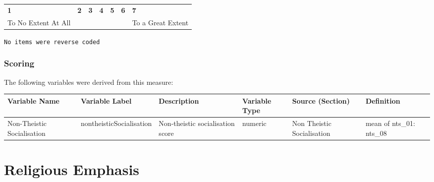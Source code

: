 \documentclass[
  letterpaper,
]{scrbook}
\begin{document}
\begin{longtable}[]{@{}
  >{\raggedright\arraybackslash}p{}
  >{\raggedright\arraybackslash}p{}
  >{\raggedright\arraybackslash}p{}
  >{\raggedright\arraybackslash}p{}
  >{\raggedright\arraybackslash}p{}
  >{\raggedright\arraybackslash}p{}
  >{\raggedright\arraybackslash}p{}@{}}
\toprule\noalign{}
\endhead
\bottomrule\noalign{}
\endlastfoot
\textbf{1} & \textbf{2} & \textbf{3} & \textbf{4} & \textbf{5} &
\textbf{6} & \textbf{7} \\
To No Extent At All & & & & & & To a Great Extent \\
\end{longtable}

\texttt{No\ items\ were\ reverse\ coded}

\subsection{Scoring}\label{scoring-5}

The following variables were derived from this measure:

\begin{tabu} to 
\toprule
Variable Name & Variable Label & Description & Variable Type & Source (Section) & Definition\\
\midrule
Non-Theistic Socialisation & nontheisticSocialisation & Non-theistic socialisation score & numeric & Non Theistic Socialisation & mean of nts\_01: nts\_08\\
\bottomrule
\end{tabu}

\section{}\label{section-1}

\chapter{Religious Emphasis}\label{religious-emphasis}
\end{document}
